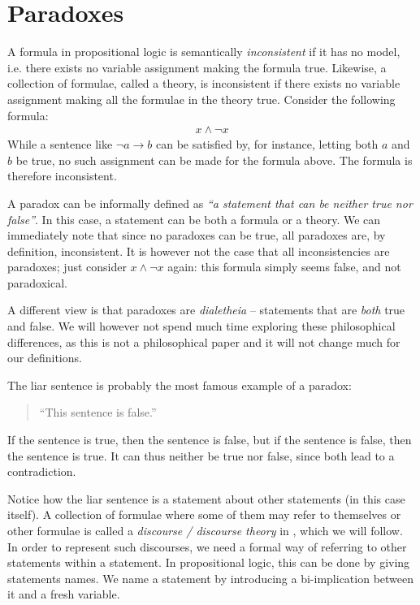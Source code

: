 \section{Paradoxes}
\label{sec:Paradoxes}
A formula in propositional logic is semantically \textit{inconsistent} if it has no model, i.e. there exists no variable assignment making the formula true.
Likewise, a collection of formulae, called a theory, is inconsistent if there exists no variable assignment making all the formulae in the theory true.
Consider the following formula:
\begin{align}
  x \wedge \neg x
\end{align}
While a sentence like $\neg a \rightarrow b$ can be satisfied by, for instance, letting both $a$ and $b$ be true, no such assignment can be made for the formula above.
The formula is therefore inconsistent.

A paradox can be informally defined as \textit{``a statement that can be neither true nor false''}.
In this case, a statement can be both a formula or a theory.
We can immediately note that since no paradoxes can be true, all paradoxes are, by definition, inconsistent.
It is however not the case that all inconsistencies are paradoxes;
just consider $x \wedge \neg x$ again: this formula simply seems false, and not paradoxical.

A different view is that paradoxes are \textit{dialetheia} -- statements that are \textit{both} true and false\cite{sep-dialetheism}.
We will however not spend much time exploring these philosophical differences, as this is not a philosophical paper and it will not change much for our definitions.

The liar sentence is probably the most famous example of a paradox:
\begin{quote}
  ``This sentence is false.''
\end{quote}
If the sentence is true, then the sentence is false, but if the sentence is false, then the sentence is true.
It can thus neither be true nor false, since both lead to a contradiction.

Notice how the liar sentence is a statement about other statements (in this case itself).
A collection of formulae where some of them may refer to themselves or other formulae is called a \textit{discourse / discourse theory} in \cite{synthese-pdl}, which we will follow.
In order to represent such discourses, we need a formal way of referring to other statements within a statement.
In propositional logic, this can be done by giving statements names.
We name a statement by introducing a bi-implication between it and a fresh variable.


